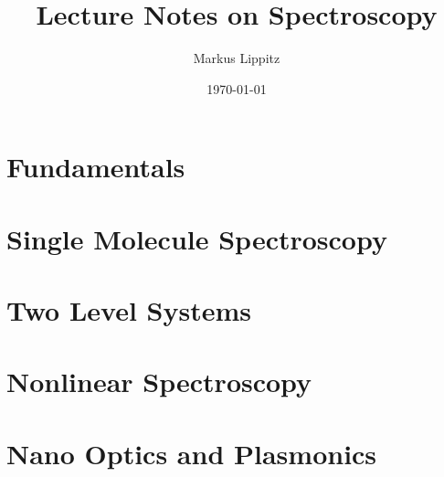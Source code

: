\documentclass[notoc,nofonts,a4paper,oneside,nobib]{tufte-book}
\begin{document}
\title{Lecture Notes on Spectroscopy}

\author{Markus Lippitz}
\date{\today}


\maketitle



\tableofcontents

\part{Fundamentals}



%







\part{Single Molecule Spectroscopy}










\part{Two Level Systems}





\part{Nonlinear Spectroscopy}






\part{Nano Optics and Plasmonics}





\printbibliography
\end{document}
